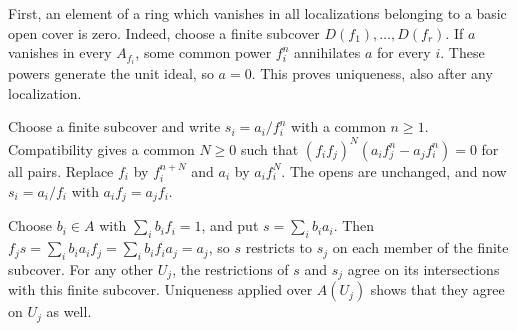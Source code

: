 First, an element of a ring which vanishes in all localizations belonging to a basic open cover is zero. Indeed, choose a finite subcover $D(f_1),\ldots,D(f_r)$. If $a$ vanishes in every $A_{f_i}$, some common power $f_i^n$ annihilates $a$ for every $i$. These powers generate the unit ideal, so $a=0$. This proves uniqueness, also after any localization.

Choose a finite subcover and write $s_i=a_i/f_i^n$ with a common $n\ge1$. Compatibility gives a common $N\ge0$ such that $(f_if_j)^N(a_if_j^n-a_jf_i^n)=0$ for all pairs. Replace $f_i$ by $f_i^{n+N}$ and $a_i$ by $a_if_i^N$. The opens are unchanged, and now $s_i=a_i/f_i$ with $a_if_j=a_jf_i$.

Choose $b_i\in A$ with $\sum_i b_if_i=1$, and put $s=\sum_i b_ia_i$. Then $f_js=\sum_i b_ia_if_j=\sum_i b_if_ia_j=a_j$, so $s$ restricts to $s_j$ on each member of the finite subcover. For any other $U_j$, the restrictions of $s$ and $s_j$ agree on its intersections with this finite subcover. Uniqueness applied over $A(U_j)$ shows that they agree on $U_j$ as well.

